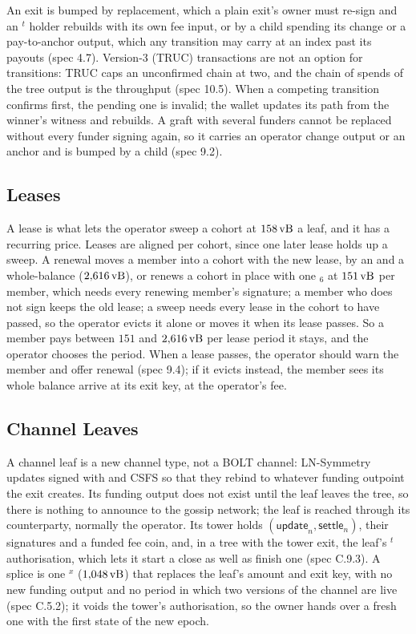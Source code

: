 An exit is bumped by replacement, which a plain exit's owner must
re-sign and an $^{t}$ holder rebuilds with its own fee input,
or by a child spending its change or a pay-to-anchor output, which any
transition may carry at an index past its payouts (spec 4.7). Version-3
(TRUC) transactions are not an option for transitions: TRUC caps an
unconfirmed chain at two, and the chain of spends of the tree output is
the throughput (spec 10.5). When a competing transition confirms first,
the pending one is invalid; the wallet updates its path from the winner's
witness and rebuilds. A graft with several funders cannot be replaced
without every funder signing again, so it carries an operator change
output or an anchor and is bumped by a child (spec 9.2).

\subsection{Leases}\label{app:impl-leases}

A lease is what lets the operator sweep a cohort at $158\,\mathrm{vB}$ a leaf, and
it has a recurring price. Leases are aligned per cohort, since one later
lease holds up a sweep. A renewal moves a member into a cohort with the
new lease, by an  and a whole-balance 
($2{,}616\,\mathrm{vB}$), or renews a cohort in place with one $_6$
at $151\,\mathrm{vB}$ per member, which needs every renewing member's signature;
a member who does not sign keeps the old lease; a sweep needs every
lease in the cohort to have passed, so the operator evicts it alone or
moves it when its lease passes. So a member pays between $151$ and $2{,}616\,\mathrm{vB}$ per lease
period it stays, and the operator chooses the period. When a lease
passes, the operator should warn the member and offer renewal (spec
9.4); if it evicts instead, the member sees its whole balance arrive at
its exit key, at the operator's fee.

\subsection{Channel Leaves}\label{app:impl-chan}

A channel leaf is a new channel type, not a BOLT channel: LN-Symmetry
updates signed with  and CSFS so that they rebind to whatever
funding outpoint the exit creates. Its funding output does not exist
until the leaf leaves the tree, so there is nothing to announce to the
gossip network; the leaf is reached through its counterparty, normally
the operator. Its tower holds $(\mathsf{update}_n, \mathsf{settle}_n)$,
their signatures and a funded fee coin, and, in a tree with the tower
exit, the leaf's $^{t}$ authorisation, which lets it start a
close as well as finish one (spec C.9.3). A splice is one $^{x}$ ($1{,}048\,\mathrm{vB}$)
that replaces the leaf's amount and exit key, with no new funding output
and no period in which two versions of the channel are live (spec
C.5.2); it voids the tower's authorisation, so the owner hands over a
fresh one with the first state of the new epoch.


